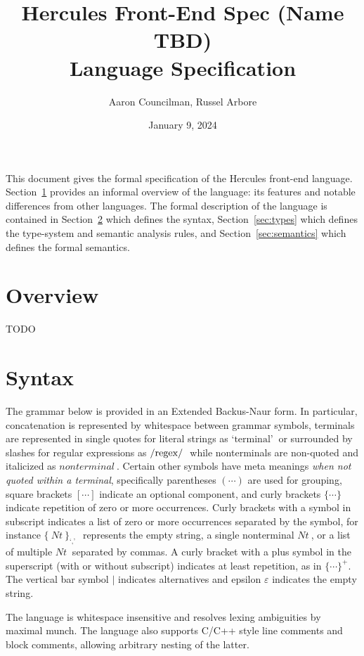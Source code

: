 \documentclass[letterpaper]{article}
\title{Hercules Front-End Spec (Name TBD) \\ \large Language Specification}
\author{Aaron Councilman, Russel Arbore}
\date{January 9, 2024}
\newcommand{\nonterminal}[1]{#1\ }
\newcommand{\terminal}[1]{\text{`#1'}\ }
\newcommand{\regex}[1]{\text{\lstinline$/#1/$}\ }
\newcommand*{\gramRepeat}[2][]{\{\ #2\}_{#1}\ }
\begin{document}
\maketitle

This document gives the formal specification of the Hercules front-end language.
Section~\ref{sec:overview} provides an informal overview of the language: its features and notable differences from other languages.
The formal description of the language is contained in Section~\ref{sec:syntax} which defines the syntax, Section~\ref{sec:types} which defines the type-system and semantic analysis rules, and Section~\ref{sec:semantics} which defines the formal semantics.

\section{Overview}\label{sec:overview}
TODO

\section{Syntax}\label{sec:syntax}
The grammar below is provided in an Extended Backus-Naur form.
In particular, concatenation is represented by whitespace between grammar symbols, terminals are represented in single quotes for literal strings as $\terminal{terminal}$ or surrounded by slashes for regular expressions as $\regex{regex}$ while nonterminals are non-quoted and italicized as $\nonterminal{nonterminal}$.
Certain other symbols have meta meanings \emph{when not quoted within a terminal}, specifically parentheses $(\cdots)$ are used for grouping, square brackets $[\cdots]$ indicate an optional component, and curly brackets $\{ \cdots \}$ indicate repetition of zero or more occurrences.
Curly brackets with a symbol in subscript indicates a list of zero or more occurrences separated by the symbol, for instance $\gramRepeat[\terminal{,}]{\nonterminal{Nt}}$ represents the empty string, a single nonterminal $\nonterminal{Nt}$, or a list of multiple $\nonterminal{Nt}$ separated by commas.
A curly bracket with a plus symbol in the superscript (with or without subscript) indicates at least repetition, as in $\{ \cdots \}^{+}$.
The vertical bar symbol $\mid$ indicates alternatives and epsilon $\varepsilon$ indicates the empty string.

The language is whitespace insensitive and resolves lexing ambiguities by maximal munch.
The language also supports C/C++ style line comments and block comments, allowing arbitrary nesting of the latter.
\end{document}
